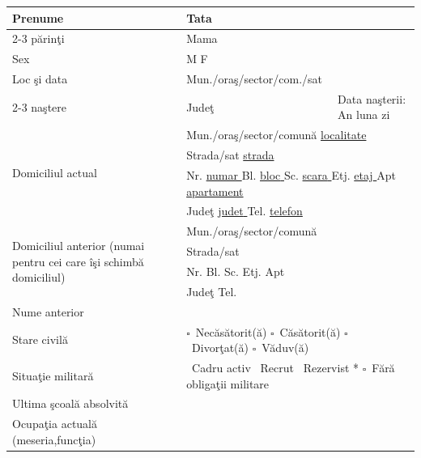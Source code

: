 \documentclass[10pt,a4paper]{article}
\newcommand{\fillline}[1][6cm]{\underline{\hspace{#1}}}
\newcommand{\fillbox}[1][0.4cm]{\framebox[#1]{\rule{0pt}{#1}}}
\newcommand{\checkboxempty}{$\square$}
\begin{document}
\begin{tabularx}{\textwidth}{|m{2.6cm}|m{3cm}|X|}
\hline
Prenume & Tata & \\
\cline{2-3}
părinţi & Mama & \\
\hline
Sex & \multicolumn{2}{l|}{\hspace{2cm} M \fillbox \hspace{4cm} F \fillbox} \\
\hline
Loc şi data & Mun./oraş/sector/com./sat & \\
\cline{2-3}
naştere & Judeţ & Data naşterii: An \fillbox\fillbox\fillbox\fillbox \quad luna \fillbox\fillbox \quad zi \fillbox\fillbox \\
\hline
\multirow{4}{2.6cm}{Domiciliul actual} & \multicolumn{2}{l|}{Mun./oraş/sector/comună \hspace{1cm} \underline{ {{localitate}} }} \\
\cline{2-3}
 & \multicolumn{2}{l|}{Strada/sat \hspace{1cm} \underline{ {{strada}} }} \\
\cline{2-3}
 & \multicolumn{2}{l|}{Nr. \underline{ {{numar}} } Bl. \underline{ {{bloc}} } Sc. \underline{ {{scara}} } Etj. \underline{ {{etaj}} } Apt \underline{ {{apartament}} }} \\
\cline{2-3}
 & \multicolumn{2}{l|}{Judeţ \underline{ {{judet}} } \hfill Tel. \underline{ {{telefon}} }} \\
\hline
\multirow{4}{2.6cm}{\footnotesize Domiciliul anterior (numai pentru cei care îşi schimbă domiciliul)} & \multicolumn{2}{l|}{Mun./oraş/sector/comună \hspace{1cm} \fillline[10cm]} \\
\cline{2-3}
 & \multicolumn{2}{l|}{Strada/sat \hspace{1cm} \fillline[12cm]} \\
\cline{2-3}
 & \multicolumn{2}{l|}{Nr. \fillline[1cm] Bl. \fillline[1cm] Sc. \fillline[1cm] Etj. \fillline[1cm] Apt \fillline[1.5cm]} \\
\cline{2-3}
 & \multicolumn{2}{l|}{Judeţ \fillline[5cm] \hfill Tel. \fillline[4cm]} \\
\hline
Nume anterior & \multicolumn{2}{l|}{\fillline[12cm]} \\
\hline
Stare civilă & \multicolumn{2}{l|}{\checkboxempty\ Necăsătorit(ă) \quad \checkboxempty\ Căsătorit(ă) \quad \checkboxempty\ Divorţat(ă) \quad \checkboxempty\ Văduv(ă)} \\
\hline
Situaţie militară & \multicolumn{2}{l|}{\fillbox\ Cadru activ \quad \fillbox\ Recrut \quad \fillbox\ Rezervist * \quad \checkboxempty\ Fără obligaţii militare} \\
\hline
Ultima şcoală absolvită & \multicolumn{2}{l|}{\fillline[12cm]} \\
\hline
Ocupaţia actuală (meseria,funcţia) & \multicolumn{2}{l|}{\fillline[12cm]} \\
\hline
\end{tabularx}
\end{document}
